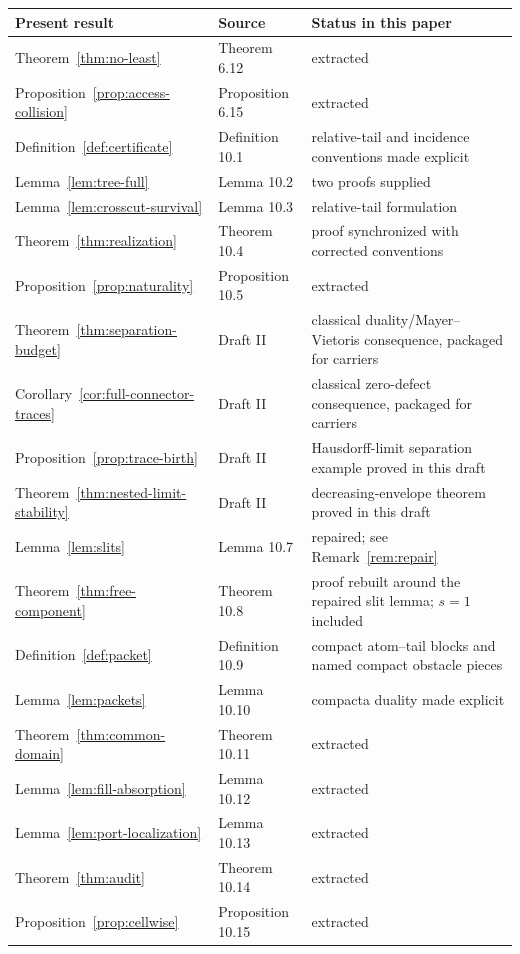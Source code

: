 \documentclass[11pt,reqno]{amsart}
\theoremstyle{definition}
\theoremstyle{remark}
\begin{document}
\begin{center}
\small
\begin{tabularx}{\textwidth}{@{}P{0.35\textwidth}P{0.22\textwidth}Y@{}}
\toprule
Present result & Source & Status in this paper\\
\midrule
Theorem~\ref{thm:no-least} & Theorem 6.12 & extracted\\
Proposition~\ref{prop:access-collision} & Proposition 6.15 & extracted\\
Definition~\ref{def:certificate} & Definition 10.1 &
relative-tail and incidence conventions made explicit\\
Lemma~\ref{lem:tree-full} & Lemma 10.2 & two proofs supplied\\
Lemma~\ref{lem:crosscut-survival} & Lemma 10.3 &
relative-tail formulation\\
Theorem~\ref{thm:realization} & Theorem 10.4 &
proof synchronized with corrected conventions\\
Proposition~\ref{prop:naturality} & Proposition 10.5 & extracted\\
Theorem~\ref{thm:separation-budget} & Draft II &
classical duality/Mayer--Vietoris consequence, packaged for carriers\\
Corollary~\ref{cor:full-connector-traces} & Draft II &
classical zero-defect consequence, packaged for carriers\\
Proposition~\ref{prop:trace-birth} & Draft II &
Hausdorff-limit separation example proved in this draft\\
Theorem~\ref{thm:nested-limit-stability} & Draft II &
decreasing-envelope theorem proved in this draft\\
Lemma~\ref{lem:slits} & Lemma 10.7 &
repaired; see Remark~\ref{rem:repair}\\
Theorem~\ref{thm:free-component} & Theorem 10.8 &
proof rebuilt around the repaired slit lemma; $s=1$ included\\
Definition~\ref{def:packet} & Definition 10.9 &
compact atom--tail blocks and named compact obstacle pieces\\
Lemma~\ref{lem:packets} & Lemma 10.10 &
compacta duality made explicit\\
Theorem~\ref{thm:common-domain} & Theorem 10.11 & extracted\\
Lemma~\ref{lem:fill-absorption} & Lemma 10.12 & extracted\\
Lemma~\ref{lem:port-localization} & Lemma 10.13 & extracted\\
Theorem~\ref{thm:audit} & Theorem 10.14 & extracted\\
Proposition~\ref{prop:cellwise} & Proposition 10.15 & extracted\\
\bottomrule
\end{tabularx}
\end{center}
\end{document}
